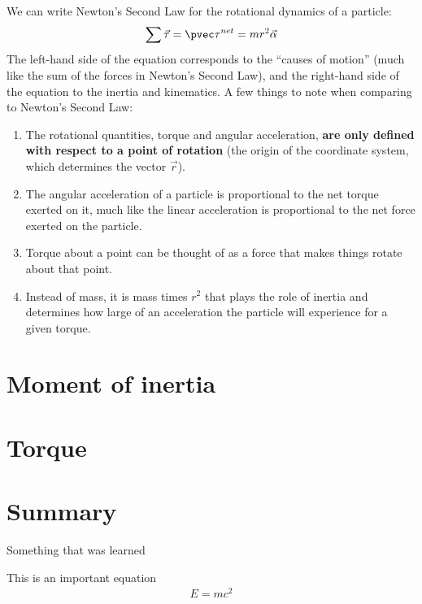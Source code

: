 We can write Newton's Second Law for the rotational dynamics of a particle:
\begin{align}
\sum \vec \tau = \pvec \tau ^{net} = mr^2 \vec \alpha
\end{align}
The left-hand side of the equation corresponds to the ``causes of motion'' (much like the sum of the forces in Newton's Second Law), and the right-hand side of the equation to the inertia and kinematics. A few things to note when comparing to Newton's Second Law:
\begin{enumerate}
\item The rotational quantities, torque and angular acceleration, \textbf{are only defined with respect to a point of rotation} (the origin of the coordinate system, which determines the vector $\vec r$).
\item The angular acceleration of a particle is proportional to the net torque exerted on it, much like the linear acceleration is proportional to the net force exerted on the particle.
\item Torque about a point can be thought of as a force that makes things rotate about that point.
\item Instead of mass, it is mass times $r^2$ that plays the role of inertia and determines how large of an acceleration the particle will experience for a given torque.  
\end{enumerate}

\section{Moment of inertia}

\section{Torque}




\newpage
\section{Summary}

\begin{chapterSummary}{
\item Something that was learned
}
\end{chapterSummary}

\newpage
\begin{importantEquations}
This is an important equation
\begin{align*}
E = mc^2
\end{align*}

\end{importantEquations}


